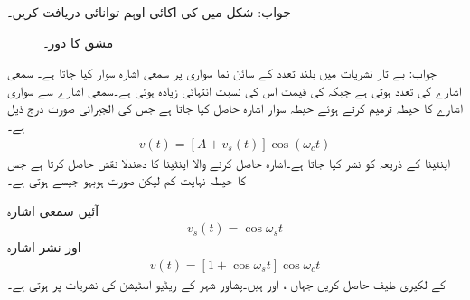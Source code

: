 جواب:
شکل  میں  کی اکائی اوہم توانائی دریافت کریں۔
\begin{figure}
\centering
{}
\caption{مشق  کا دور۔}
\label{شکل_فوریئر_امالی_دور_الف}
\end{figure}

جواب:
بے تار نشریات میں بلند تعدد  کے سائن نما سواری پر سمعی اشارہ  سوار کیا جاتا ہے۔ سمعی اشارے کی تعدد  ہوتی ہے جبکہ  کی قیمت اس کی نسبت انتہائی زیادہ ہوتی ہے۔سمعی اشارے  سے سواری اشارے کا حیطہ ترمیم کرتے ہوئے حیطہ سوار اشارہ حاصل کیا جاتا ہے جس کی الجبرائی صورت درج ذیل ہے۔
\begin{align}
v(t)=[A+v_s(t)]\cos(\omega_c t)
\end{align}
اینٹینا کے ذریعہ  کو نشر کیا جاتا ہے۔اشارہ حاصل کرنے والا اینٹینا  کا دھندلا نقش  حاصل کرتا ہے جس کا حیطہ نہایت کم لیکن صورت ہوبہو  جیسے ہوتی ہے۔

آئیں سمعی اشارہ 
\begin{align}
v_s(t)=\cos \omega_s t
\end{align}
اور  نشر اشارہ 
\begin{align}
v(t)=[1+\cos \omega_s t] \cos \omega_c t
\end{align}
کے لکیری طیف حاصل کریں جہاں ،  اور  ہیں۔پشاور شہر کے ریڈیو اسٹیشن کی نشریات  پر ہوتی ہے۔ 

